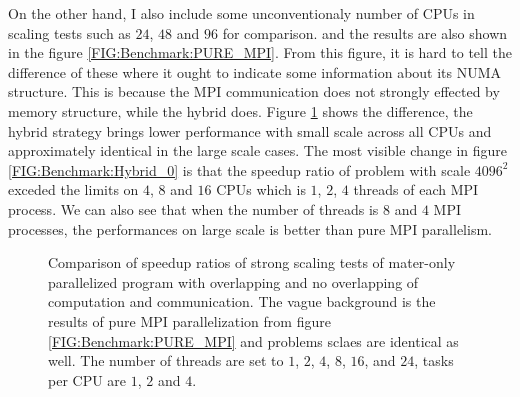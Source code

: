 On the other hand, I also include some unconventionaly number of CPUs in scaling tests such as $24$, $48$ and $96$ for comparison. and 
the results are also shown in the figure \ref{FIG:Benchmark:PURE_MPI}.
From this figure, it is hard to tell the difference of these where it ought to indicate some information about its NUMA structure.
This is because the MPI communication does not strongly effected by memory structure, while the hybrid does.
Figure \ref{FIG:Benchmark:Hybrid} shows the difference, the hybrid strategy brings lower performance with small scale across all CPUs and 
approximately identical in the large scale cases.
The most visible change in figure \ref{FIG:Benchmark:Hybrid_0} is that the speedup ratio of problem with scale $4096^2$ 
exceded the limits on $4$, $8$ and $16$ CPUs which is $1$, $2$, $4$ threads of each MPI process.
We can also see that when the number of threads is $8$ and $4$ MPI processes, the performances on large scale is better than pure MPI parallelism.

\begin{figure}[htbp]
  \centering
  \hfill
  \caption{
    Comparison of speedup ratios of strong scaling tests of mater-only parallelized program with overlapping and no overlapping of computation and communication.  
    The vague background is the results of pure MPI parallelization from figure \ref{FIG:Benchmark:PURE_MPI} and problems sclaes are identical as well.
    The number of threads are set to $1$, $2$, $4$, $8$, $16$, and $24$, 
    tasks per CPU are $1$, $2$ and $4$.
  }
  \label{FIG:Benchmark:Hybrid}
\end{figure}


